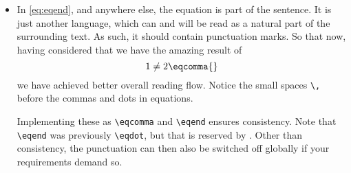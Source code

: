 \begin{itemize}
	We can \verb|\DeclareMathOperator{\examplemean}{MEAN}|, then use \verb|\text| for the subscript:
	\begin{equation}\label{eq:eqend}
		\examplemean_{\text{sample}} \neq 2 \eqend{}
	\end{equation}
	\item In \cref{eq:eqend}, and anywhere else, the equation is part of the sentence.
	It is just another language, which can and will be read as a natural part of the surrounding text.
	As such, it should contain punctuation marks.
	So that now, having considered that we have the amazing result of
	\begin{equation}
		1 \neq 2 \eqcomma{}
	\end{equation}
	we have achieved better overall reading flow.
	Notice the small spaces \verb|\,| before the commas and dots in equations.
	
	Implementing these as \verb|\eqcomma| and \verb|\eqend| ensures consistency.
	Note that \verb|\eqend| was previously \verb|\eqdot|, but that is reserved by .
	Other than consistency, the punctuation can then also be switched off globally if your requirements demand so.
\end{itemize}